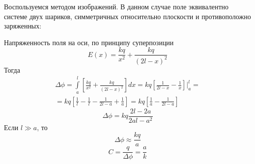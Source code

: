 \documentclass[a4paper,14pt]{extarticle}
\begin{document}
Воспользуемся методом изображений. В данном случае поле эквивалентно системе двух шариков, симметричных относительно плоскости и противоположно заряженных:

\begin{figure}[H]
    \centering
\end{figure}

Напряженность поля на оси, по принципу суперпозиции
\begin{equation}
    E(x)=\frac{kq}{x^2}+\frac{kq}{(2l-x)^2}
\end{equation}
Тогда
\begin{gather}
    \Delta\phi=\int\limits_a^l 
    \left[
    \frac{kq}{x^2}+\frac{kq}{(2l-x)^2}
    \right]dx=
    kq\left[
        \frac{1}{2l-x}
        -
        \frac{1}{x}
    \right]\bigg|_a^l=\\=
    kq\left[\frac{1}{l}-\frac{1}{l}-\frac{1}{2l-a}+\frac{1}{a}\right]
    =
    kq\left[\frac{1}{a}-\frac{1}{2l-a}\right]
\end{gather}
\begin{equation}
    \Delta\phi=kq\frac{2l-2a}{2al-a^2}
\end{equation}
Если $l\gg a$, то
\begin{equation}
    \Delta\phi\approx \frac{kq}{a}
\end{equation}
\begin{equation}
    C=\frac{q}{\Delta\phi}=\frac{a}{k}
\end{equation}
\end{document}
